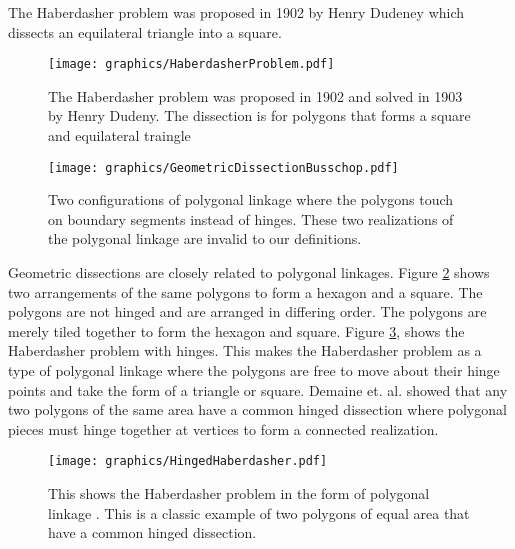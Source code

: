 The Haberdasher problem was proposed in 1902 by Henry Dudeney which dissects an equilateral triangle into a square.
\begin{figure}[!htbp]
\begin{center}
\texttt{[image: graphics/HaberdasherProblem.pdf]}
\end{center}
\caption{The Haberdasher problem was proposed in 1902 and solved in 1903 by Henry Dudeny.  The dissection is for polygons that forms a square and equilateral traingle
 }
\label{fig:polygonallinkage-5}
\end{figure}
\newpage
\begin{figure}[!htbp]
\begin{center}
\texttt{[image: graphics/GeometricDissectionBusschop.pdf]}
\end{center}
\caption{Two configurations of polygonal linkage where the polygons touch on boundary segments 
instead of hinges.  These two realizations of the polygonal linkage are invalid to our definitions. 
 }
\label{fig:polygonallinkage-4}
\end{figure}
Geometric dissections are closely related to polygonal linkages.  Figure \ref{fig:polygonallinkage-4} shows two arrangements of the same polygons to form a hexagon and a square. 
The polygons are not hinged and are arranged in differing order.
The polygons are merely tiled together to form the hexagon and square.    
Figure \ref{fig:HingedHaberdasher}, shows the Haberdasher problem with hinges.  
This makes the Haberdasher problem as a type of polygonal linkage where the polygons are free to move about their hinge points and take the form of a triangle or square.  
Demaine et. al. \cite{abbott2012hinged} showed that any two polygons of the same area have a common hinged dissection where polygonal pieces must hinge together at vertices to form a connected realization.
\begin{figure}[!htbp]
\begin{center}
\texttt{[image: graphics/HingedHaberdasher.pdf]}
\end{center}
\caption{This shows the Haberdasher problem in the form of polygonal linkage \cite{abbott2012hinged}.  This is a classic example of two polygons of equal area that have a common hinged dissection.}
\label{fig:HingedHaberdasher}
\end{figure}







